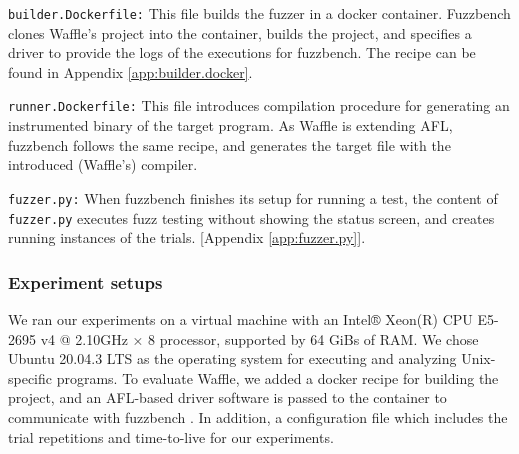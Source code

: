 \begin{itemize}
    \begin{sloppypar}
    \item \texttt{builder.Dockerfile:} This file builds the fuzzer in a docker container. Fuzzbench clones Waffle's project into the container, builds the project, and specifies a driver to provide the logs of the executions for fuzzbench. The recipe can be found in Appendix \ref{app:builder.docker}.
    \end{sloppypar}
    \item \texttt{runner.Dockerfile:} This file introduces compilation procedure for generating an instrumented binary of the target program. As Waffle is extending AFL, fuzzbench follows the same recipe, and generates the target file with the introduced (Waffle's) compiler.
    
    \item \texttt{fuzzer.py:} When fuzzbench finishes its setup for running a test, the content of \texttt{fuzzer.py} executes fuzz testing without showing the status screen, and creates running instances of the trials. [Appendix \ref{app:fuzzer.py}].
\end{itemize}


\subsubsection{Experiment setups}

We ran our experiments on a virtual machine with an Intel® Xeon(R) CPU E5-2695 v4 @ 2.10GHz × 8 processor, supported by 64 GiBs of RAM. We chose Ubuntu 20.04.3 LTS as the operating system for executing and analyzing Unix-specific programs. To evaluate Waffle, we added a docker recipe for building the project, and an AFL-based driver software is passed to the container to communicate with fuzzbench \cite{afl_driver}. In addition, a configuration file which includes the trial repetitions and time-to-live for our experiments.


